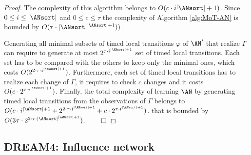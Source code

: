 \documentclass[runningheads,a4paper]{llncs}
\begin{document}
\begin{theorem}[Complexity]
\begin{proof}
		
			The complexity of this algorithm belongs to $O(c \cdot i^|\ANsort|+1)$.
			Since $0 \leq i \leq |\ANsort|$ and $0 \leq c \leq \tau$ the complexity of Algorithm \ref{alg:MoT-AN} is bounded by $O(\tau \cdot |\ANsort|^{|\ANsort|+1}))$.
		
			Generating all minimal subsets of timed local transitions $\varphi$ of $\AN'$ that realize $\Gamma$ can require to generate at most $2^{\tau \cdot i^{|\ANsort|+1}}$ set of timed local transitions.
			Each set has to be compared with the others to keep only the minimal ones, which costs $O(2^{2\cdot \tau \cdot i^{|\ANsort|+1}})$.
			Furthermore, each set of timed local transitions has to realize each change of $\Gamma$, it requires to check $c$ changes and it costs $O(c \cdot  2^{\tau \cdot i^{|\ANsort|+1}})$.
			Finally, the total complexity of learning $\AN$ by generating timed local transitions from the observations of $\Gamma$ belongs to
			$O(c\cdot i^{|\ANsort|+1} + 2^{2\cdot \tau\cdot i^{|\ANsort|+1}} + c \cdot  2^{\tau \cdot  i^{|\ANsort|+1}})$.
			that is bounded by $O(3\tau \cdot 2^{2\cdot \tau \cdot |\ANsort|^{|\ANsort|+1}})$.
			$\qed$
		\end{proof}
	\end{theorem}
    
    \subsection{DREAM4: Influence network}
    
\end{document}
